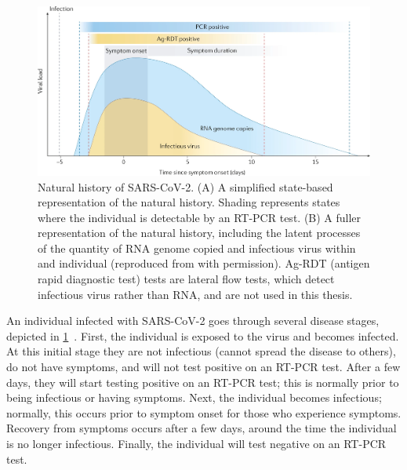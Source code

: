 \documentclass[thesis.tex]{subfiles}
\begin{document}
\begin{figure}
{
  }
  \centering\includegraphics[width=\textwidth]{biology-data/natural-history}
  \caption[Natural history of SARS-CoV-2.]{%
    Natural history of SARS-CoV-2.
    (A) A simplified state-based representation of the natural history.
    Shading represents states where the individual is detectable by an RT-PCR test.
    (B) A fuller representation of the natural history, including the latent processes of the quantity of RNA genome copied and infectious virus within and individual (reproduced from \textcite{puhachSARSCoV2} with permission).
    Ag-RDT (antigen rapid diagnostic test) tests are lateral flow tests, which detect infectious virus rather than RNA, and are not used in this thesis.
  }
  \label{biology-data:fig:natural-history}
\end{figure}

An individual infected with SARS-CoV-2 goes through several disease stages, depicted in \cref{biology-data:fig:natural-history}~\autocite{puhachSARSCoV2}.
First, the individual is exposed to the virus and becomes infected.
At this initial stage they are not infectious (cannot spread the disease to others), do not have symptoms, and will not test positive on an RT-PCR test.
After a few days, they will start testing positive on an RT-PCR test; this is normally prior to being infectious or having symptoms.
Next, the individual becomes infectious; normally, this occurs prior to symptom onset for those who experience symptoms.
Recovery from symptoms occurs after a few days, around the time the individual is no longer infectious.
Finally, the individual will test negative on an RT-PCR test.
\end{document}
